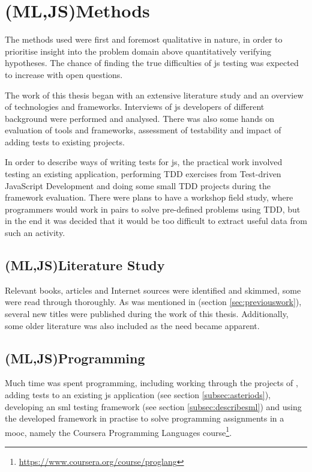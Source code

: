 \documentclass[11pt]{article}
\begin{document}
\section{(ML,JS)Methods}

The methods used were first and foremost qualitative in nature, in order to prioritise insight into the problem domain above quantitatively verifying hypotheses. The chance of finding the true difficulties of \gls{js} testing was expected to increase with open questions.

The work of this thesis began with an extensive literature study and an overview of technologies and frameworks. Interviews of \gls{js} developers of different background were performed and analysed. There was also some hands on evaluation of tools and frameworks, assessment of testability and impact of adding tests to existing projects.

In order to describe ways of writing tests for \gls{js}, the practical work involved testing an existing application, performing TDD exercises from Test-driven JavaScript Development \cite{Tddjs} and doing some small TDD projects during the framework evaluation. There were plans to have a workshop field study, where programmers would work in pairs to solve pre-defined problems using TDD, but in the end it was decided that it would be too difficult to extract useful data from such an activity.

\subsection{(ML,JS)Literature Study}

Relevant books, articles and Internet sources were identified and skimmed, some were read through thoroughly. As was mentioned in  (section \ref{sec:previouswork}), several new titles were published during the work of this thesis. Additionally, some older literature was also included as the need became apparent.

\subsection{(ML,JS)Programming}
\label{subsec:programming}

Much time was spent programming, including working through the projects of \cite[part~III]{Tddjs}, adding tests to an existing \gls{js} application (see section \ref{subsec:asteriods}), developing an \gls{sml} testing framework (see section \ref{subsec:describesml}) and using the developed framework in practise to solve programming assignments in a \gls{mooc}, namely the Coursera Programming Languages course\footnote{\url{https://www.coursera.org/course/proglang}}.
\end{document}

